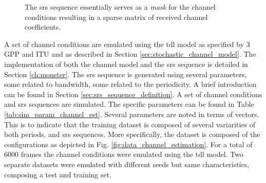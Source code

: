 \begin{figure}
    \centering
    \vspace{2em}
    \caption{The \gls{srs} sequence essentially serves as a \emph{mask} for the channel conditions resulting in a sparse matrix of received channel coefficients.}
    \label{fig:srs_sequence_example}
\end{figure}

A set of channel conditions are emulated using the \gls{tdl} model as specified by $3$GPP and ITU \cite{3GPP38901, ITU2412} and as described in Section \ref{sec:stochastic_channel_model}. The implementation of both the channel model and the \gls{srs} sequence is detailed in Section \ref{ch:monster}. The \gls{srs} sequence is generated using several parameters, some related to bandwidth, some related to the periodicity. A brief introduction can be found in Section \ref{sec:srs_sequence_definition}. A set of channel conditions and \gls{srs} sequences are simulated. The specific parameters can be found in Table \ref{tab:sim_param_channel_est}. Several parameters are noted in terms of vectors. This is to indicate that the training dataset is composed of several variarities of both periods, and \gls{srs} sequences. More specifically, the dataset is composed of the configurations as depicted in Fig. \ref{fig:data_channel_estimation}. For a total of $6000$ frames the channel conditions were emulated using the \gls{tdl} model. Two separate datasets were emulated with different seeds but same characteristics, composing a test and training set. 

